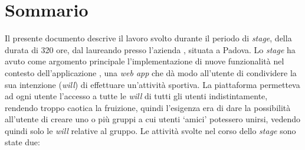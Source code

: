
\cleardoublepage
{}
{}
\begingroup
\let\clearpage\relax
\let\cleardoublepage\relax
\let\cleardoublepage\relax

\chapter*{Sommario}

Il presente documento descrive il lavoro svolto durante il periodo di
\textit{stage},
della durata di 320 ore, dal laureando \myName presso
l'azienda \myCompany, situata a Padova.
Lo \textit{stage} ha avuto come argomento principale l'implementazione di nuove
funzionalità nel contesto dell'applicazione \productName, una
\textit{web app} che dà modo all'utente di condividere la sua intenzione
(\textit{will}) di effettuare un'attività sportiva.
La piattaforma permetteva ad ogni utente l'accesso a tutte le \textit{will} di
tutti gli utenti indistintamente,
rendendo troppo caotica la
fruizione, quindi l'esigenza era di dare la possibilità all'utente
di creare uno o più gruppi a cui utenti \enquote*{amici} potessero unirsi,
vedendo quindi solo le \textit{will} relative al gruppo.
Le attività svolte nel corso dello \textit{stage} sono state due:

